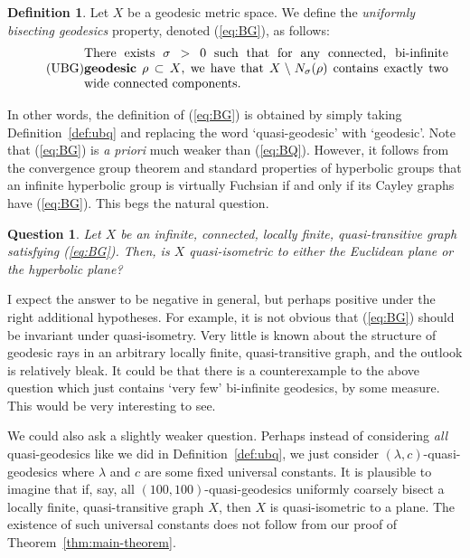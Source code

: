 \documentclass[11pt,a4paper]{amsart}
\newtheorem{question}[theorem]{Question}
\theoremstyle{definition}
\newtheorem{definition}[theorem]{Definition}
\newcommand{\property}{(\ref{eq:BQ})}
\begin{document}
\begin{definition}
    Let $X$ be a geodesic metric space. We define the \emph{uniformly bisecting geodesics} property, denoted (\ref{eq:BG}), as follows:
        \begin{equation}
  \tag{$\rm{UBG}$}\label{eq:BG}
  \parbox{4in}{%
    \strut
    There exists $\sigma > 0$ such that for any connected, bi-infinite \textbf{geodesic} $\rho \subset X$, we have that $X \setminus N_\sigma(\rho)$ contains exactly two wide connected components. 
    \strut
  }
\end{equation}
\end{definition}

In other words, the definition of (\ref{eq:BG}) is obtained by simply taking Definition~\ref{def:ubq} and replacing the word `quasi-geodesic' with `geodesic'.
Note that (\ref{eq:BG}) is \emph{a priori} much weaker than \property{}. However, it follows from the convergence group theorem and standard properties of hyperbolic groups that an infinite hyperbolic group is virtually Fuchsian if and only if its Cayley graphs have (\ref{eq:BG}). This begs the natural question.

\begin{question}
    Let $X$ be an infinite, connected, locally finite, quasi-transitive graph satisfying (\ref{eq:BG}). Then, is $X$ quasi-isometric to either the Euclidean plane or the hyperbolic plane?
\end{question}

I expect the answer to be negative in general, but perhaps positive under the right additional hypotheses. For example, it is not obvious that (\ref{eq:BG}) should be invariant under quasi-isometry. Very little is known about the structure of geodesic rays in an arbitrary locally finite, quasi-transitive graph, and the outlook is relatively bleak. It could be that there is a counterexample to the above question which just contains `very few' bi-infinite geodesics, by some measure. This would be very interesting to see.

We could also ask a slightly weaker question. Perhaps instead of considering \emph{all} quasi-geodesics like we did in Definition~\ref{def:ubq}, we just consider $(\lambda,c)$-quasi-geodesics where $\lambda$ and $c$ are some fixed universal constants. It is plausible to imagine that if, say, all $(100,100)$-quasi-geodesics uniformly coarsely bisect a locally finite, quasi-transitive graph $X$, then $X$ is quasi-isometric to a plane. The existence of such universal constants does not follow from our proof of Theorem~\ref{thm:main-theorem}. 



\end{document}
